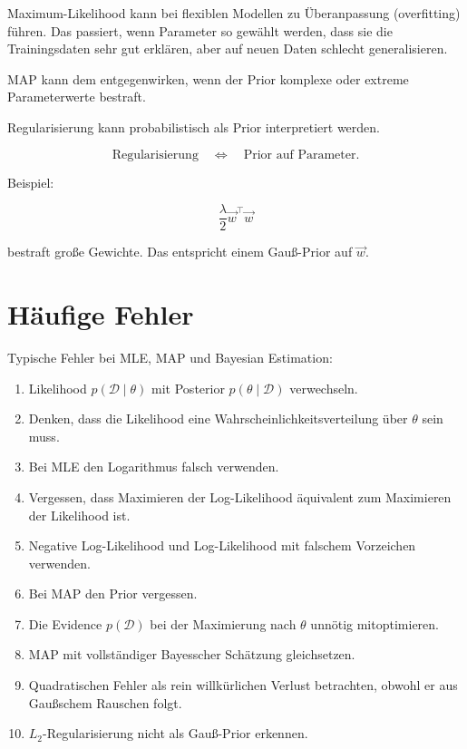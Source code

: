 Maximum-Likelihood kann bei flexiblen Modellen zu Überanpassung (overfitting) führen.
Das passiert, wenn Parameter so gewählt werden, dass sie die Trainingsdaten sehr gut erklären, aber auf neuen Daten schlecht generalisieren.

MAP kann dem entgegenwirken, wenn der Prior komplexe oder extreme Parameterwerte bestraft.

\begin{conceptbox}
Regularisierung kann probabilistisch als Prior interpretiert werden.

\[
    \text{Regularisierung}
    \quad
    \Longleftrightarrow
    \quad
    \text{Prior auf Parameter}.
\]
\end{conceptbox}

Beispiel:

\[
    \frac{\lambda}{2}
    \vec{w}^{\top}\vec{w}
\]

bestraft große Gewichte.
Das entspricht einem Gauß-Prior auf \(\vec{w}\).

\section{Häufige Fehler}

\begin{examtipbox}
Typische Fehler bei MLE, MAP und Bayesian Estimation:

\begin{enumerate}
    \item Likelihood \(p(\mathcal{D}\mid\theta)\) mit Posterior \(p(\theta\mid\mathcal{D})\) verwechseln.
    \item Denken, dass die Likelihood eine Wahrscheinlichkeitsverteilung über \(\theta\) sein muss.
    \item Bei MLE den Logarithmus falsch verwenden.
    \item Vergessen, dass Maximieren der Log-Likelihood äquivalent zum Maximieren der Likelihood ist.
    \item Negative Log-Likelihood und Log-Likelihood mit falschem Vorzeichen verwenden.
    \item Bei MAP den Prior vergessen.
    \item Die Evidence \(p(\mathcal{D})\) bei der Maximierung nach \(\theta\) unnötig mitoptimieren.
    \item MAP mit vollständiger Bayesscher Schätzung gleichsetzen.
    \item Quadratischen Fehler als rein willkürlichen Verlust betrachten, obwohl er aus Gaußschem Rauschen folgt.
    \item \(L_2\)-Regularisierung nicht als Gauß-Prior erkennen.
\end{enumerate}
\end{examtipbox}

